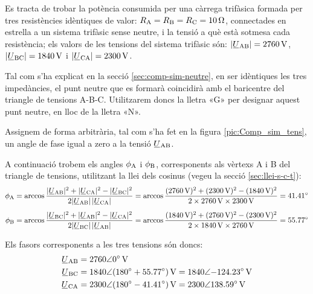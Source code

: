 \begin{exemple}\label{ex:ImpedEquil}
	\addcontentsxms{\ImpedEquil}
    Es tracta de trobar la potència consumida per una càrrega trifàsica
    formada per tres resistències idèntiques de valor: $R_\mathrm{A}=R_\mathrm{B}=R_\mathrm{C}=\qty{10}{\ohm}$,
    connectades en estrella a un sistema trifàsic sense neutre, i la
    tensió a què està sotmesa cada resistència; els valors de les
    tensions del sistema trifàsic són: $|\cmplx{U}\ped{AB}| =
    \qty{2760}{V}$, $|\cmplx{U}\ped{BC}| = \qty{1840}{V}$ i
    $|\cmplx{U}\ped{CA}| = \qty{2300}{V}$.

    Tal com s'ha explicat en la secció \vref{sec:comp-sim-neutre}, en ser idèntiques les tres impedàncies, el punt neutre que es formarà coincidirà amb el baricentre del triangle de tensions A-B-C. Utilitzarem doncs la lletra «G» per designar aquest punt neutre, en lloc de la lletra «N».

    Assignem de forma arbitrària, tal com s'ha fet en la figura
    \vref{pic:Comp_sim_tens}, un angle de fase igual a zero a la tensió
    $\cmplx{U}\ped{AB}$.

    \begin{center}
        
    \end{center}

    A continuació trobem els angles $\phi_\mathrm{A}$ i $\phi_\mathrm{B}$,
    corresponents als vèrtexs  A i B del triangle de
    tensions, utilitzant la llei dels cosinus (vegeu la secció
    \vref{sec:llei-s-c-t}): 
    \begin{align*}
        \phi\ped{A} &= \arccos \frac{|\cmplx{U}\ped{AB}|^2 + |\cmplx{U}\ped{CA}|^2 -
        |\cmplx{U}\ped{BC}|^2}{2 |\cmplx{U}\ped{AB}| \,|\cmplx{U}\ped{CA}|} =
        \arccos \frac{(\qty{2760}{V})^2 + (\qty{2300}{V})^2 - (\qty{1840}{V})^2}{2 \times \qty{2760}{V}
        \times \qty{2300}{V}} = \ang{41,41} \\[1ex]
        \phi\ped{B} &= \arccos \frac{|\cmplx{U}\ped{BC}|^2 + |\cmplx{U}\ped{AB}|^2 -
        |\cmplx{U}\ped{CA}|^2}{2 |\cmplx{U}\ped{BC}| \,|\cmplx{U}\ped{AB}|} =
        \arccos \frac{(\qty{1840}{V})^2 + (\qty{2760}{V})^2 - (\qty{2300}{V})^2}{2 \times \qty{1840}{V}
        \times \qty{2760}{V}} = \ang{55,77}
    \end{align*}

    Els fasors corresponents a les tres tensions són doncs:
    \begin{align*}
    \cmplx{U}\ped{AB} &= \complexqty{2760:0}{V} \\
    \cmplx{U}\ped{BC} &= \num{1840}\angle(\ang{180} + \ang{55,77})\unit{\,V} =
    \complexqty{1840:-124,23}{V} \\
    \cmplx{U}\ped{CA} &= \num{2300}\angle(\ang{180} - \ang{41,41})\unit{\,V} = \complexqty{2300:138,59}{V} 
    \end{align*}


\end{exemple}

